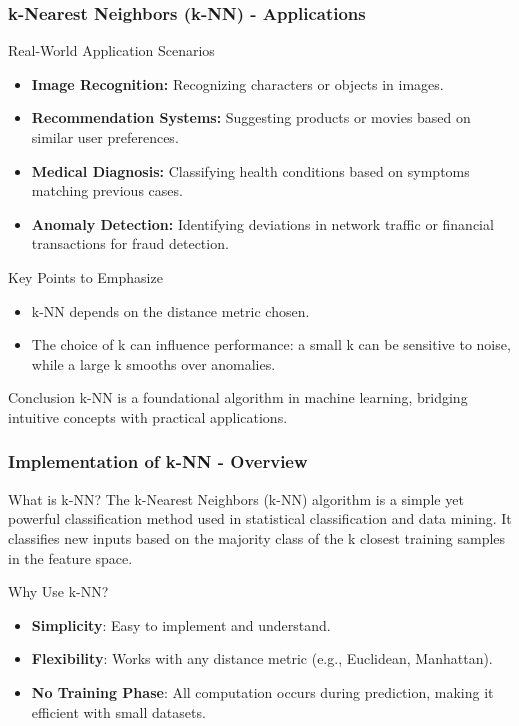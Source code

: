 \documentclass[aspectratio=169]{beamer}
\begin{document}
\begin{frame}[fragile]
    \frametitle{k-Nearest Neighbors (k-NN) - Applications}
    \begin{block}{Real-World Application Scenarios}
        \begin{itemize}
            \item \textbf{Image Recognition:} Recognizing characters or objects in images.
            \item \textbf{Recommendation Systems:} Suggesting products or movies based on similar user preferences.
            \item \textbf{Medical Diagnosis:} Classifying health conditions based on symptoms matching previous cases.
            \item \textbf{Anomaly Detection:} Identifying deviations in network traffic or financial transactions for fraud detection.
        \end{itemize}
    \end{block}

    \begin{block}{Key Points to Emphasize}
        \begin{itemize}
            \item k-NN depends on the distance metric chosen.
            \item The choice of k can influence performance: a small k can be sensitive to noise, while a large k smooths over anomalies.
        \end{itemize}
    \end{block}
    
    \begin{block}{Conclusion}
        k-NN is a foundational algorithm in machine learning, bridging intuitive concepts with practical applications.
    \end{block}
\end{frame}

\begin{frame}[fragile]
    \frametitle{Implementation of k-NN - Overview}
    \begin{block}{What is k-NN?}
        The k-Nearest Neighbors (k-NN) algorithm is a simple yet powerful classification method used in statistical classification and data mining. It classifies new inputs based on the majority class of the k closest training samples in the feature space.
    \end{block}
    
    \begin{block}{Why Use k-NN?}
        \begin{itemize}
            \item \textbf{Simplicity}: Easy to implement and understand.
            \item \textbf{Flexibility}: Works with any distance metric (e.g., Euclidean, Manhattan).
            \item \textbf{No Training Phase}: All computation occurs during prediction, making it efficient with small datasets.
        \end{itemize}
    \end{block}
\end{frame}
\end{document}
